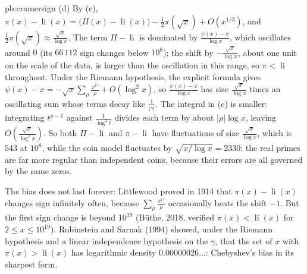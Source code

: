 \begin{solution}{pb:cramersign}
(d) By (c), $\pi(x)-\operatorname{li}(x)=\bigl(\Pi(x)-\operatorname{li}(x)\bigr)-\frac12\pi(\sqrt x)+O(x^{1/3})$, and $\frac12\pi(\sqrt x)\approx\frac{\sqrt x}{\log x}$. The term $\Pi-\operatorname{li}$ is dominated by
$\frac{\psi(x)-x}{\log x}$, which oscillates around $0$ (its $66\,112$ sign changes below $10^8$); the shift by $-\frac{\sqrt x}{\log x}$, about one unit on the scale of the data, is larger
than the oscillation in this range, so $\pi<\operatorname{li}$ throughout. Under the Riemann hypothesis, the explicit formula gives $\psi(x)-x=-\sqrt x\sum_\rho\frac{x^{i\gamma}}\rho+O(\log^2x)$,
so $\frac{\psi(x)-x}{\log x}$ has size $\frac{\sqrt x}{\log x}$ times an oscillating sum whose terms decay like $\frac1{|\gamma|}$. The integral in (c) is smaller: integrating $t^{\rho-1}$ against
$\frac1{\log^2t}$ divides each term by about $|\rho|\log x$, leaving $O(\frac{\sqrt x}{\log^2x})$. So both $\Pi-\operatorname{li}$ and $\pi-\operatorname{li}$ have fluctuations of size $\frac{\sqrt x}{\log x}$,
which is $543$ at $10^8$, while the coin model fluctuates by $\sqrt{x/\log x}=2330$: the real primes are far more regular than independent coins, because their errors are all
governed by the same zeros.


\leads The bias does not last forever: Littlewood proved in 1914 that $\pi(x)-\operatorname{li}(x)$ changes sign infinitely often, because $\sum_\rho\frac{x^{i\gamma}}\rho$ occasionally beats
the shift $-1$. But the first sign change is beyond $10^{19}$ (Büthe, 2018, verified $\pi(x)<\operatorname{li}(x)$ for $2\le x\le10^{19}$). Rubinstein and Sarnak (1994) showed, under the
Riemann hypothesis and a linear independence hypothesis on the $\gamma$, that the set of $x$ with $\pi(x)>\operatorname{li}(x)$ has logarithmic density $0.00000026\ldots$: Chebyshev's bias in
its sharpest form.
\end{solution}


